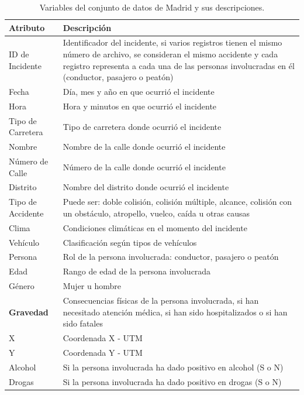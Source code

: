 \documentclass{uathesis-es}
\begin{document}
{%
\begin{table}[ht]
    \begin{center}
        \begin{tabular}{|p{3cm}|p{11cm}|}
            \hline
            \textbf{Atributo} & \textbf{Descripción} \\ \hline \hline
            ID de Incidente  & Identificador del incidente, si varios registros tienen el mismo número de archivo, se consideran el mismo accidente y cada registro representa a cada una de las personas involucradas en él (conductor, pasajero o peatón)  \\ \hline
            Fecha  & Día, mes y año en que ocurrió el incidente \\ \hline
            Hora  & Hora y minutos en que ocurrió el incidente \\ \hline
            Tipo de Carretera & Tipo de carretera donde ocurrió el incidente \\ \hline
            Nombre & Nombre de la calle donde ocurrió el incidente \\ \hline
            Número de Calle & Número de la calle donde ocurrió el incidente  \\ \hline
            Distrito & Nombre del distrito donde ocurrió el incidente \\ \hline
            Tipo de Accidente  & Puede ser: doble colisión, colisión múltiple, alcance, colisión con un obstáculo, atropello, vuelco, caída u otras causas \\ \hline
            Clima  & Condiciones climáticas en el momento del incidente \\ \hline
            Vehículo  & Clasificación según tipos de vehículos \\ \hline
            Persona  & Rol de la persona involucrada: conductor, pasajero o peatón \\ \hline
            Edad  & Rango de edad de la persona involucrada \\ \hline
            Género  & Mujer u hombre \\ \hline
            \textbf{Gravedad}  & Consecuencias físicas de la persona involucrada, si han necesitado atención médica, si han sido hospitalizados o si han sido fatales \\ \hline
            X   & Coordenada X - UTM \\ \hline
            Y   & Coordenada Y - UTM \\ \hline
            Alcohol & Si la persona involucrada ha dado positivo en alcohol (S o N) \\ \hline
            Drogas & Si la persona involucrada ha dado positivo en drogas (S o N) \\ \hline \hline
        \end{tabular}
    \end{center}
    \caption{Variables del conjunto de datos de Madrid y sus descripciones.}
    \label{Datadescription}
\end{table}

}
\end{document}
